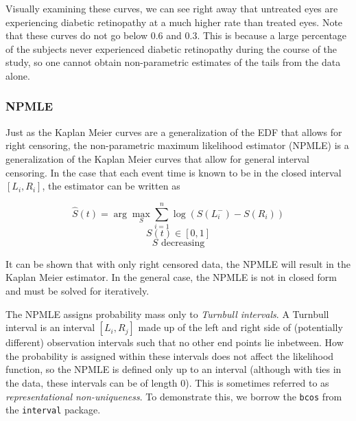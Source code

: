 \documentclass[a4paper]{article}
\begin{document}
Visually examining these curves, we can see right away that untreated eyes are experiencing diabetic retinopathy at a much higher rate than treated eyes. Note that these curves do not go below 0.6 and 0.3. This is because a large percentage of the subjects never experienced diabetic retinopathy during the course of the study, so one cannot obtain non-parametric estimates of the tails from the data alone. 
    
    \subsubsection{NPMLE}
  
  Just as the Kaplan Meier curves are a generalization of the EDF that allows for right censoring, the non-parametric maximum likelihood estimator (NPMLE) is a generalization of the Kaplan Meier curves that allow for general interval censoring. In the case that each event time is known to be in the closed interval $[L_i, R_i]$, the estimator can be written as
  
\[
  \hat S(t) = \arg \max_S 
  \displaystyle
  \sum_{i = 1}^n \log(S(L_i^{-}) - S(R_i))
\]
\[
  S(t) \in [0,1]
\]
\[
  S \text{ decreasing}
\]

  It can be shown that with only right censored data, the NPMLE will result in the Kaplan Meier estimator. In the general case, the NPMLE is not in closed form and must be solved for iteratively. 

  The NPMLE assigns probability mass only to \emph{Turnbull intervals}. A Turnbull interval is an interval $[L_i, R_j]$ made up of the left and right side of (potentially different) observation intervals such that no other end points lie inbetween. How the probability is assigned within these intervals does not affect the likelihood function, so the NPMLE is defined only up to an interval (although with ties in the data, these intervals can be of length 0). This is sometimes referred to as \emph{representational non-uniqueness}. To demonstrate this, we borrow the \texttt{bcos} from the \texttt{interval} package. 
  
\end{document}
